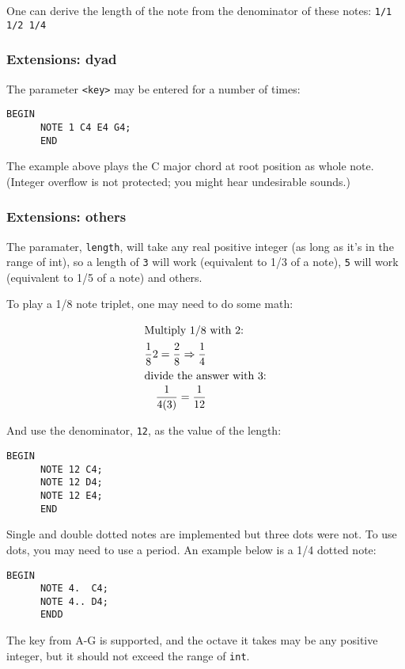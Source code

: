 \documentclass{article}
\begin{document}
One can derive the length of the note from the denominator of these notes:
\verb+1/1 1/2 1/4+

\subsubsection{Extensions: dyad}
The parameter \verb+<key>+ may be entered for a number of times:
\begin{Verbatim}[frame=single]
      BEGIN
      NOTE 1 C4 E4 G4;
      END
\end{Verbatim}

The example above plays the C major chord at root position as whole note. (Integer overflow is not
protected; you might hear undesirable sounds.)

\subsubsection{Extensions: others}
The paramater, \verb+length+, will take any real positive integer (as long as it's in the range of int),
so a length of \verb+3+ will work (equivalent to 1/3 of a note), \verb+5+ will work (equivalent to 1/5
of a note) and others. \newline

To play a 1/8 note triplet, one may need to do some math:

\begin{align}
	\shortintertext{Multiply 1/8 with 2:}
	\frac{1}{8}2 = \frac{2}{8} \Rightarrow \frac{1}{4} \\
	\shortintertext{divide the answer with 3:}
	\frac{1}{4(3)} = \frac{1}{12}
\end{align}

And use the denominator, \verb+12+, as the value of the length:
\begin{Verbatim}[frame=single]
      BEGIN
      NOTE 12 C4;
      NOTE 12 D4;
      NOTE 12 E4;
      END
\end{Verbatim}

Single and double dotted notes are implemented but three dots were not. To use dots, you may need to use a period. An example below is a 1/4 dotted note:
\begin{Verbatim}[frame=single]
      BEGIN
      NOTE 4.  C4;
      NOTE 4.. D4;
      ENDD
\end{Verbatim}

The key from A-G is supported, and the octave it takes may be any positive integer, but
it should not exceed the range of \verb+int+. \newline
\end{document}
